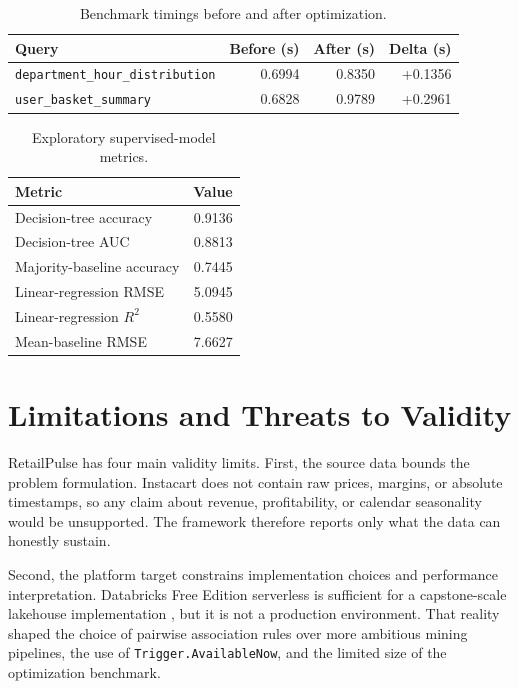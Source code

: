 \documentclass[journal]{IEEEtran}
\begin{document}
\begin{table}[!t]
\caption{Benchmark timings before and after optimization.}
\label{tab:optimize_summary}
\centering
\footnotesize
\begin{tabular}{p{2.8cm} r r r}
\toprule
\textbf{Query} & \textbf{Before (s)} & \textbf{After (s)} & \textbf{Delta (s)} \\
\midrule
\texttt{department\_hour\_distribution} & 0.6994 & 0.8350 & +0.1356 \\
\texttt{user\_basket\_summary} & 0.6828 & 0.9789 & +0.2961 \\
\bottomrule
\end{tabular}
\end{table}

\begin{table}[!t]
\caption{Exploratory supervised-model metrics.}
\label{tab:exploratory_metrics}
\centering
\footnotesize
\begin{tabular}{p{4.5cm} r}
\toprule
\textbf{Metric} & \textbf{Value} \\
\midrule
Decision-tree accuracy & 0.9136 \\
Decision-tree AUC & 0.8813 \\
Majority-baseline accuracy & 0.7445 \\
Linear-regression RMSE & 5.0945 \\
Linear-regression \(R^2\) & 0.5580 \\
Mean-baseline RMSE & 7.6627 \\
\bottomrule
\end{tabular}
\end{table}

\section{Limitations and Threats to Validity}
RetailPulse has four main validity limits. First, the source data bounds the problem formulation. Instacart does not contain raw prices, margins, or absolute timestamps, so any claim about revenue, profitability, or calendar seasonality would be unsupported. The framework therefore reports only what the data can honestly sustain.

Second, the platform target constrains implementation choices and performance interpretation. Databricks Free Edition serverless is sufficient for a capstone-scale lakehouse implementation \cite{databricks_free}, but it is not a production environment. That reality shaped the choice of pairwise association rules over more ambitious mining pipelines, the use of \texttt{Trigger.AvailableNow}, and the limited size of the optimization benchmark.
\end{document}
